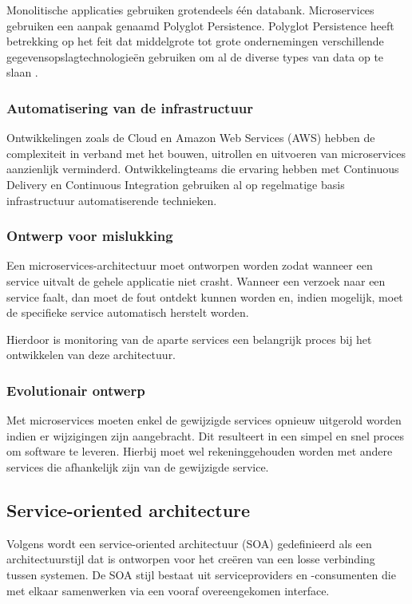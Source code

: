 Monolitische applicaties gebruiken grotendeels één databank. Microservices gebruiken een aanpak genaamd Polyglot Persistence. Polyglot Persistence heeft betrekking op het feit dat middelgrote tot grote ondernemingen verschillende gegevensopslagtechnologieën gebruiken om al de diverse types van data op te slaan \autocite{Fowler2011}.

\subsubsection{Automatisering van de infrastructuur}

Ontwikkelingen zoals de Cloud en Amazon Web Services (AWS) hebben de complexiteit in verband met het bouwen, uitrollen en uitvoeren van microservices aanzienlijk verminderd. Ontwikkelingteams die ervaring hebben met Continuous Delivery en Continuous Integration gebruiken al op regelmatige basis infrastructuur automatiserende technieken.

\subsubsection{Ontwerp voor mislukking}

Een microservices-architectuur moet ontworpen worden zodat wanneer een service uitvalt de gehele applicatie niet crasht. Wanneer een verzoek naar een service faalt, dan moet de fout ontdekt kunnen worden en, indien mogelijk, moet de specifieke service automatisch herstelt worden.

Hierdoor is monitoring van de aparte services een belangrijk proces bij het ontwikkelen van deze architectuur.

\subsubsection{Evolutionair ontwerp}

Met microservices moeten enkel de gewijzigde services opnieuw uitgerold worden indien er wijzigingen zijn aangebracht. Dit resulteert in een simpel en snel proces om software te leveren. Hierbij moet wel rekeninggehouden worden met andere services die afhankelijk zijn van de gewijzigde service.

\subsection{Service-oriented architecture}
\label{sec:soa}

Volgens \textcite{Rojas2021} wordt een service-oriented architectuur (SOA) gedefinieerd als een architectuurstijl dat is ontworpen voor het creëren van een losse verbinding tussen systemen. De SOA stijl bestaat uit serviceproviders en -consumenten die met elkaar samenwerken via een vooraf overeengekomen interface. 

